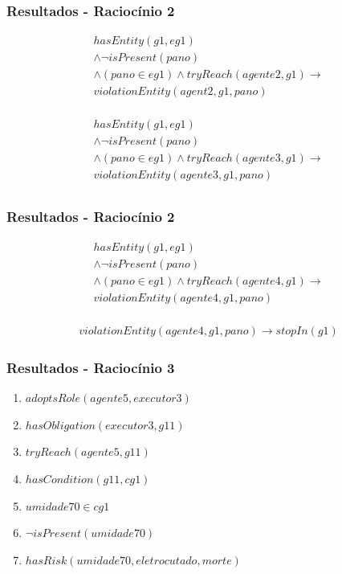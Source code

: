 \documentclass{beamer}
\begin{document}
\begin{frame}
	\frametitle{Resultados - Raciocínio 2}
	\begin{eqnarray}\nonumber
		hasEntity(g1,eg1) \nonumber \\ 
		\wedge \neg isPresent(pano) 	\nonumber \\ 
		\wedge (pano \in eg1) \wedge tryReach(agente2,g1) \to \nonumber \\ 
		violationEntity(agent2,g1,pano) \nonumber \\
	\end{eqnarray}

	\begin{eqnarray}\nonumber
		hasEntity(g1,eg1) \nonumber \\ 
		\wedge \neg isPresent(pano) 	\nonumber \\ 
		\wedge (pano \in eg1) \wedge tryReach(agente3,g1) \to \nonumber \\ 
		violationEntity(agente3,g1,pano) \nonumber \\
	\end{eqnarray}

\end{frame}
\begin{frame}
	\frametitle{Resultados - Raciocínio 2}
	\begin{eqnarray}\nonumber
		hasEntity(g1,eg1) \nonumber \\ 
		\wedge \neg isPresent(pano) 	\nonumber \\ 
		\wedge (pano \in eg1) \wedge tryReach(agente4,g1) \to \nonumber \\ 
		violationEntity(agente4,g1,pano) \nonumber \\
	\end{eqnarray}

	\begin{eqnarray}
		violationEntity(agente4,g1,pano) \to stopIn(g1)
	\end{eqnarray}
\end{frame}

\begin{frame}
	\frametitle{Resultados - Raciocínio 3}
	\begin{enumerate}
		\item $adoptsRole(agente5,executor3)$
		\item $hasObligation(executor3,g11)$	
		\item $tryReach(agente5,g11)$ 
		\item $hasCondition(g11,cg1)$
		\item $umidade70 \in cg1$	
		\item $\neg isPresent(umidade70)$
		\item $hasRisk(umidade70,eletrocutado,morte)$
	\end{enumerate}
\end{frame}
\end{document}
